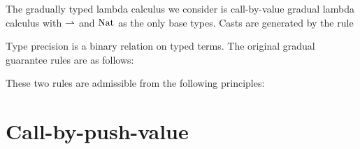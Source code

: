 The gradually typed lambda calculus we consider is call-by-value
gradual lambda calculus with $\rightharpoonup$ and $\text{Nat}$ as the only base types.
Casts are generated by the rule

Type precision is a binary relation on typed terms. The original
gradual guarantee rules are as follows:
These two rules are admissible from the following principles:




\section{Call-by-push-value}

